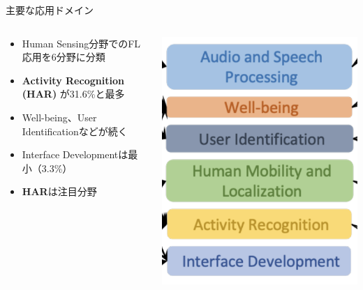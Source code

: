 \documentclass[unicode,12pt,aspectratio=169,dvipdfmx]{beamer}
\begin{document}
\begin{frame}{主要な応用ドメイン}
  \begin{columns}
    \begin{column}[T]{0.65\linewidth}
      \begin{itemize}
        \item Human Sensing分野でのFL応用を6分野に分類
        \item \textbf{Activity Recognition (HAR)} が31.6\%と最多
        \item Well-being、User Identificationなどが続く
        \item Interface Developmentは最小（3.3\%）
        \item \textbf{HAR}は注目分野
      \end{itemize}
    \end{column}
    \begin{column}[T]{0.35\linewidth}
      \includegraphics[width=\linewidth]{figures/対象の分野.png}
    \end{column}
  \end{columns}
\end{frame}
\end{document}
